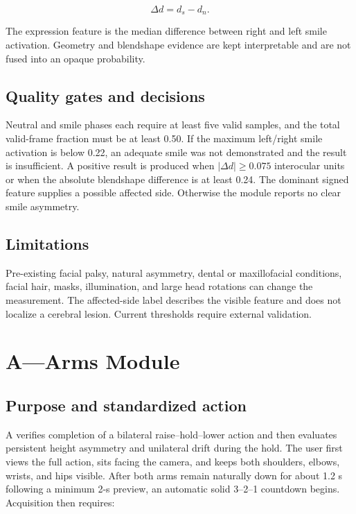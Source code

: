 \documentclass[11pt,a4paper]{article}
\begin{document}
\begin{equation}
\Delta d=d_s-d_n.
\end{equation}

The expression feature is the median difference between right and left smile activation. Geometry and blendshape evidence are kept interpretable and are not fused into an opaque probability.

\subsection{Quality gates and decisions}

Neutral and smile phases each require at least five valid samples, and the total valid-frame fraction must be at least 0.50. If the maximum left/right smile activation is below 0.22, an adequate smile was not demonstrated and the result is insufficient. A positive result is produced when $|\Delta d|\geq0.075$ interocular units or when the absolute blendshape difference is at least 0.24. The dominant signed feature supplies a possible affected side. Otherwise the module reports no clear smile asymmetry.

\subsection{Limitations}

Pre-existing facial palsy, natural asymmetry, dental or maxillofacial conditions, facial hair, masks, illumination, and large head rotations can change the measurement. The affected-side label describes the visible feature and does not localize a cerebral lesion. Current thresholds require external validation.

\section{A---Arms Module}

\subsection{Purpose and standardized action}

A verifies completion of a bilateral raise--hold--lower action and then evaluates persistent height asymmetry and unilateral drift during the hold. The user first views the full action, sits facing the camera, and keeps both shoulders, elbows, wrists, and hips visible. After both arms remain naturally down for about 1.2 s following a minimum 2-s preview, an automatic solid 3--2--1 countdown begins. Acquisition then requires:
\end{document}
